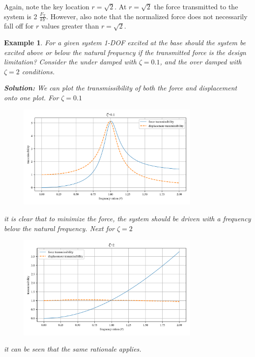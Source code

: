 \documentclass[12pt,letter]{article}
\newtheorem{ex}{Example}
\numberwithin{ex}{section} %
\newenvironment{example}{\begin{mdframed}[middlelinewidth=0.5mm]\begin{ex}\normalfont}{\end{ex}\end{mdframed}}
\numberwithin{re}{section} %
\begin{document}
Again, note the key location $r=\sqrt{2}$. At $r=\sqrt{2}$ the force transmitted to the system is 2 $\frac{F_\text{T}}{kY}$. However, also note that the normalized force does not necessarily fall off for $r$ values greater than $r=\sqrt{2}$.  

\begin{example}


			For a given system 1-DOF excited at the base should the system be excited above or below the natural frequency if the transmitted force is the design limitation? Consider the under damped with $\zeta=0.1$, and the over damped with $\zeta=2$ conditions. 

			\noindent\textbf{Solution:} We can plot the transmissibility of both the force and displacement onto one plot. For $\zeta=0.1$
			\begin{figure}[H]
				\centering
				\includegraphics[width=0.8\textwidth]{../Figures/example_1_force_displacement_transmissibility_1.png}
			\end{figure}
			it is clear that to minimize the force, the system should be driven with a frequency below the natural frequency. Next for  $\zeta=2$
			\begin{figure}[H]
				\centering
				\includegraphics[width=0.8\textwidth]{../Figures/example_1_force_displacement_transmissibility_2.png}
			\end{figure}			
			it can be seen that the same rationale applies. 

\end{example}
\end{document}

